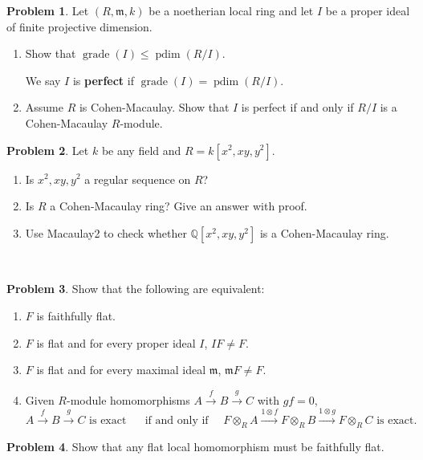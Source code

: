 \documentclass[11pt]{article}
\newcommand{\m}{\mathfrak{m}}
\newcommand{\Q}{\mathbb{Q}}
\DeclareMathOperator{\pdim}{pdim}
\DeclareMathOperator{\grade}{grade}
\theoremstyle{definition}
\newtheorem{problem}{Problem}
\begin{document}
\begin{problem}
	Let $(R, \m, k)$ be a noetherian local ring and let $I$ be a proper ideal of finite projective dimension.
	
	\vspace{-0.5em}
	\begin{enumerate}[label=\alph*), itemsep=-0.1em]
	\item Show that $\grade(I) \leqslant \pdim(R/I)$.
	
	We say $I$ is {\bf perfect} if $\grade(I) = \pdim(R/I)$.
	\item Assume $R$ is Cohen-Macaulay. Show that $I$ is perfect if and only if $R/I$ is a Cohen-Macaulay $R$-module.	
	\end{enumerate}
\end{problem}


	\begin{problem}
	Let $k$ be any field and $R = k[x^2,xy,y^2]$.
	
	
\vspace{-0.5em}
	\begin{enumerate}[label=\alph*), itemsep=-0.1em]
		\item Is $x^2, xy, y^2$ a regular sequence on $R$?
		\item Is $R$ a Cohen-Macaulay ring? Give an answer with proof.
		\item Use Macaulay2 to check whether $\Q[x^2,xy,y^2]$ is a Cohen-Macaulay ring.
	\end{enumerate}
\end{problem}

\

\noindent
{} 

\vspace{1em}

\begin{problem}
Show that the following are equivalent:	
\begin{enumerate}[label=\arabic*), itemsep=-0.1em]
		\item $F$ is faithfully flat.
		\item $F$ is flat and for every proper ideal $I$, $IF \neq F$.
		\item $F$ is flat and for every maximal ideal $\m$, $\m F \neq F$.
		\item Given $R$-module homomorphisms $A \xrightarrow{f} B \xrightarrow{g} C$ with $gf=0$,
		\[A \xrightarrow{f} B \xrightarrow{g} C \text{ is exact } \quad \text{ if and only if } \quad F \otimes_R A \xrightarrow{1 \otimes f} F \otimes_R B \xrightarrow{1 \otimes g} F \otimes_R C \text{ is exact.} \]
	\end{enumerate}
\end{problem}

\begin{problem}
	Show that any flat local homomorphism must be faithfully flat.
\end{problem}
\end{document}
